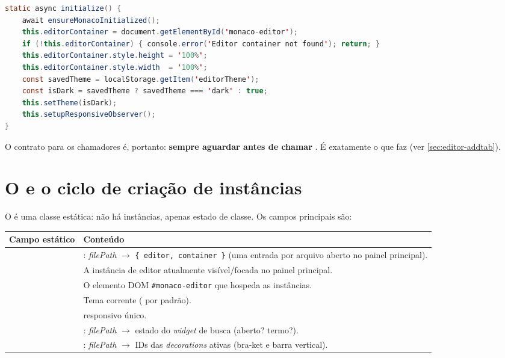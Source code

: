 \begin{lstlisting}[language=Java]
static async initialize() {
    await ensureMonacoInitialized();
    this.editorContainer = document.getElementById('monaco-editor');
    if (!this.editorContainer) { console.error('Editor container not found'); return; }
    this.editorContainer.style.height = '100%';
    this.editorContainer.style.width  = '100%';
    const savedTheme = localStorage.getItem('editorTheme');
    const isDark = savedTheme ? savedTheme === 'dark' : true;
    this.setTheme(isDark);
    this.setupResponsiveObserver();
}
\end{lstlisting}

\noindent
O contrato para os chamadores é, portanto: \textbf{sempre aguardar
 antes de chamar }. É
exatamente o que  faz (ver \autoref{sec:editor-addtab}).

\section{O  e o ciclo de criação de instâncias}
\label{sec:editor-manager}

O  é uma classe estática: não há instâncias, apenas estado
de classe. Os campos principais são:

\begin{tabularx}{\linewidth}{Y Y}
\toprule
\textbf{Campo estático} & \textbf{Conteúdo} \\
\midrule
{} & : \emph{filePath} $\rightarrow$ \lstinline|{ editor, container }| (uma entrada por arquivo aberto no painel principal). \\
 & A instância de editor atualmente visível/focada no painel principal. \\
 & O elemento DOM \lstinline|#monaco-editor| que hospeda as instâncias. \\
 & Tema corrente ( por padrão). \\
 &  responsivo único. \\
 & : \emph{filePath} $\rightarrow$ estado do \emph{widget} de busca (aberto? termo?). \\
 & : \emph{filePath} $\rightarrow$ IDs das \emph{decorations} ativas (bra-ket e barra vertical). \\
\bottomrule
\end{tabularx}

